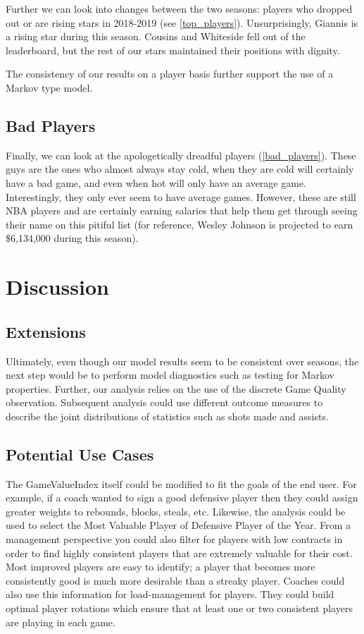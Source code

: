 \documentclass[12pt, authoryear]{elsarticle}
\begin{document}
Further we can look into changes between the two seasons: players who dropped out or are rising stars in 2018-2019 (see \ref{top_players}). Unsurprisingly, Giannis is a rising star during this season. Cousins and Whiteside fell out of the leaderboard, but the rest of our stars maintained their positions with dignity.

The consistency of our results on a player basis further support the use of a Markov type model.

\subsection{Bad Players}

Finally, we can look at the apologetically dreadful players (\ref{bad_players}). These guys are the ones who almost always stay cold, when they are cold will certainly have a bad game, and even when hot will only have an average game. Interestingly, they only ever seem to have average games. However, these are still NBA players and are certainly earning salaries that help them get through seeing their name on this pitiful list (for reference, Wesley Johnson is projected to earn \$6,134,000 during this season). 

\section{Discussion}

\subsection{Extensions}

Ultimately, even though our model results seem to be consistent over seasons, the next step would be to perform model diagnostics such as testing for Markov properties. Further,  our analysis relies on the use of the discrete Game Quality observation. Subsequent analysis could use different outcome measures to describe the joint distributions of statistics such as shots made and assists. 

\subsection{Potential Use Cases}

The GameValueIndex itself could be modified to fit the goals of the end user. For example, if a coach wanted to sign a good defensive player then they could assign greater weights to rebounds, blocks, steals, etc. Likewise, the analysis could be used to select the Most Valuable Player of Defensive Player of the Year. From a management perspective you could also filter for players with low contracts in order to find highly consistent players that are extremely valuable for their cost. Most improved players are easy to identify; a player that becomes more consistently good is much more desirable than a streaky player. Coaches could also use this information for load-management for players. They could build optimal player rotations which ensure that at least one or two consistent players are playing in each game. 
\end{document}
